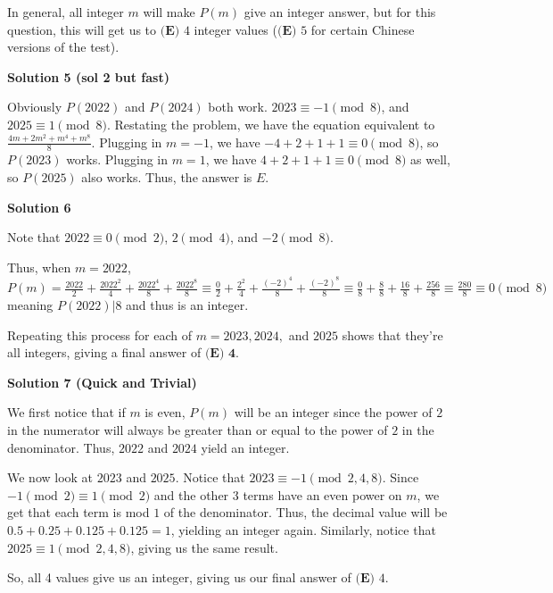 \begin{enumerate}
 In general, all integer $m$ will make $P(m)$ give an integer answer, but for this question, this will get us to $\boxed{\textbf{(E) }4}$ integer values ($\boxed{\textbf{(E) }5}$ for certain Chinese versions of the test).

 



\textbf{Solution 5 (sol 2 but fast)}

Obviously $P(2022)$ and $P(2024)$ both work. $2023 \equiv -1 \pmod 8$, and $2025 \equiv 1 \pmod 8$. Restating the problem, we have the equation equivalent to $\frac{4m+2m^2 + m^4 + m^8}{8}$. Plugging in $m=-1$, we have $-4+2+1+1 \equiv 0 \pmod 8$, so $P(2023)$ works. Plugging in $m=1$, we have $4+2+1+1 \equiv 0 \pmod 8$ as well, so $P(2025)$ also works. Thus, the answer is $\boxed{E}$.

 



\textbf{Solution 6}

Note that $2022 \equiv  0\pmod{2}$, $2\pmod{4}$, and $-2\pmod{8}$. 

 Thus, when $m=2022$, $P(m) = \frac{2022}{2} + \frac{2022^2}{4} + \frac{2022^4}{8} + \frac{2022^8}{8} \equiv \frac{0}{2} + \frac{2^2}{4} + \frac{(-2)^4}{8} + \frac{(-2)^8}{8} \equiv \frac{0}{8} + \frac{8}{8} + \frac{16}{8} + \frac{256}{8} \equiv \frac{280}{8} \equiv 0\pmod{8}$ meaning $P(2022)|8$ and thus is an integer. 

 Repeating this process for each of $m=2023, 2024,$ and $2025$ shows that they're all integers, giving a final answer of $\boxed{\textbf{(E) 4}}$.

 



\textbf{Solution 7 (Quick and Trivial)}

We first notice that if $m$ is even, $P(m)$ will be an integer since the power of $2$ in the numerator will always be greater than or equal to the power of $2$ in the denominator. Thus, $2022$ and $2024$ yield an integer. 

 We now look at $2023$ and $2025$. Notice that $2023 \equiv -1 \pmod {2, 4, 8}$. Since $-1 \pmod 2 \equiv 1 \pmod 2$ and the other 3 terms have an even power on $m$, we get that each term is mod $1$ of the denominator. Thus, the decimal value will be $0.5 + 0.25 + 0.125 + 0.125 = 1$, yielding an integer again. Similarly, notice that $2025 \equiv 1 \pmod {2, 4, 8}$, giving us the same result. 

 So, all 4 values give us an integer, giving us our final answer of $\boxed{\textbf{(E) } 4}$.


\end{enumerate}
